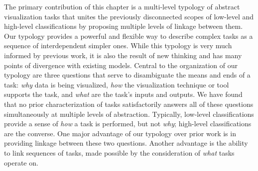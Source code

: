 The primary contribution of this chapter is a multi-level typology of abstract visualization tasks that unites the previously disconnected scopes of low-level and high-level classifications by proposing multiple levels of linkage between them.
Our typology provides a powerful and flexible way to describe complex tasks as a sequence of interdependent simpler ones.
While this typology is very much informed by previous work, it is also the result of new thinking and has many points of divergence with existing models.
Central to the organization of our typology are three questions that serve to disambiguate the means and ends of a task: {\it why} data is being visualized, {\it how} the visualization technique or tool supports the task, and {\it what} are the task's inputs and outputs.
We have found that no prior characterization of tasks satisfactorily answers all of these questions simultaneously at multiple levels of abstraction.
Typically, low-level classifications provide a sense of {\it how} a task is performed, but not {\it why}; high-level classifications are the converse.
One major advantage of our typology over prior work is in providing linkage between these two questions.
Another advantage is the ability to link sequences of tasks, made possible by the consideration of {\it what} tasks operate on.

